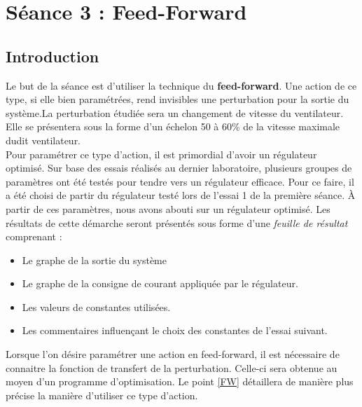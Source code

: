 \section{Séance 3 : Feed-Forward}
\subsection{Introduction}
Le but de la séance est d'utiliser la technique du \textbf{feed-forward}. Une action de ce type, si elle bien paramétrées, rend invisibles une perturbation pour la sortie du système.La perturbation étudiée sera un changement de vitesse du ventilateur. Elle se présentera sous la forme d'un échelon 50 à 60\% de la vitesse maximale dudit ventilateur.\\

Pour paramétrer ce type d'action, il est primordial d'avoir un régulateur optimisé. Sur base des essais réalisés au dernier laboratoire, plusieurs groupes de paramètres ont été testés pour tendre vers un régulateur efficace. Pour ce faire, il a été choisi de partir du régulateur testé lors de l'essai 1 de la première séance. À partir de ces paramètres, nous avons abouti sur un régulateur optimisé. Les résultats de cette démarche seront présentés sous forme d'une \textit{feuille de résultat} comprenant :
\begin{itemize}
\item Le graphe de la sortie du système 
\item Le graphe de la consigne de courant appliquée par le régulateur.
\item Les valeurs de constantes utilisées.
\item Les commentaires influençant le choix des constantes de l'essai suivant.
\end{itemize}

Lorsque l'on désire paramétrer une action en feed-forward, il est nécessaire de connaitre la fonction de transfert de la perturbation. Celle-ci sera obtenue au moyen d'un programme d'optimisation. Le point \ref{FW} détaillera de manière plus précise la manière d'utiliser ce type d'action.\\ 


